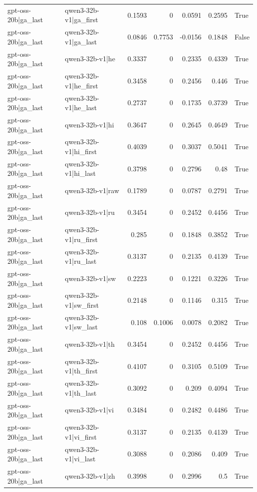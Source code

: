 \begin{table}
\begin{tabular}{l l r r r r l}
gpt-oss-20b|ga_last & qwen3-32b-v1|ga_first & 0.1593 & 0 & 0.0591 & 0.2595 & True \\
gpt-oss-20b|ga_last & qwen3-32b-v1|ga_last & 0.0846 & 0.7753 & -0.0156 & 0.1848 & False \\
gpt-oss-20b|ga_last & qwen3-32b-v1|he & 0.3337 & 0 & 0.2335 & 0.4339 & True \\
gpt-oss-20b|ga_last & qwen3-32b-v1|he_first & 0.3458 & 0 & 0.2456 & 0.446 & True \\
gpt-oss-20b|ga_last & qwen3-32b-v1|he_last & 0.2737 & 0 & 0.1735 & 0.3739 & True \\
gpt-oss-20b|ga_last & qwen3-32b-v1|hi & 0.3647 & 0 & 0.2645 & 0.4649 & True \\
gpt-oss-20b|ga_last & qwen3-32b-v1|hi_first & 0.4039 & 0 & 0.3037 & 0.5041 & True \\
gpt-oss-20b|ga_last & qwen3-32b-v1|hi_last & 0.3798 & 0 & 0.2796 & 0.48 & True \\
gpt-oss-20b|ga_last & qwen3-32b-v1|raw & 0.1789 & 0 & 0.0787 & 0.2791 & True \\
gpt-oss-20b|ga_last & qwen3-32b-v1|ru & 0.3454 & 0 & 0.2452 & 0.4456 & True \\
gpt-oss-20b|ga_last & qwen3-32b-v1|ru_first & 0.285 & 0 & 0.1848 & 0.3852 & True \\
gpt-oss-20b|ga_last & qwen3-32b-v1|ru_last & 0.3137 & 0 & 0.2135 & 0.4139 & True \\
gpt-oss-20b|ga_last & qwen3-32b-v1|sw & 0.2223 & 0 & 0.1221 & 0.3226 & True \\
gpt-oss-20b|ga_last & qwen3-32b-v1|sw_first & 0.2148 & 0 & 0.1146 & 0.315 & True \\
gpt-oss-20b|ga_last & qwen3-32b-v1|sw_last & 0.108 & 0.1006 & 0.0078 & 0.2082 & True \\
gpt-oss-20b|ga_last & qwen3-32b-v1|th & 0.3454 & 0 & 0.2452 & 0.4456 & True \\
gpt-oss-20b|ga_last & qwen3-32b-v1|th_first & 0.4107 & 0 & 0.3105 & 0.5109 & True \\
gpt-oss-20b|ga_last & qwen3-32b-v1|th_last & 0.3092 & 0 & 0.209 & 0.4094 & True \\
gpt-oss-20b|ga_last & qwen3-32b-v1|vi & 0.3484 & 0 & 0.2482 & 0.4486 & True \\
gpt-oss-20b|ga_last & qwen3-32b-v1|vi_first & 0.3137 & 0 & 0.2135 & 0.4139 & True \\
gpt-oss-20b|ga_last & qwen3-32b-v1|vi_last & 0.3088 & 0 & 0.2086 & 0.409 & True \\
gpt-oss-20b|ga_last & qwen3-32b-v1|zh & 0.3998 & 0 & 0.2996 & 0.5 & True \\

\end{tabular}
\end{table}

